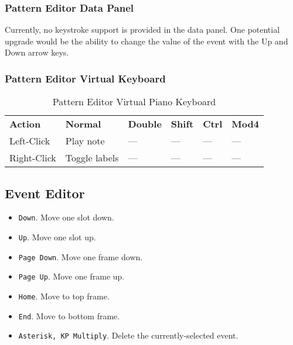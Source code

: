 \subsubsection{Pattern Editor Data Panel}
\label{subsubsec:kbd_mouse_pattern_editor_data_panel}

   Currently, no keystroke support is provided in the data panel.
   One potential upgrade would be the ability to change the value of the event
   with the Up and Down arrow keys.

\subsubsection{Pattern Editor Virtual Keyboard}
\label{subsubsec:kbd_mouse_pattern_editor_virtual_keyboard}

   \begin{table}[H]
      \centering
      \caption{Pattern Editor Virtual Piano Keyboard}
      \label{table:pattern_editor_virtual_piano_keyboard}
      \begin{tabular}{l l l l l l}
         \textbf{Action}   & \textbf{Normal} & \textbf{Double}    & \textbf{Shift} & \textbf{Ctrl}   & \textbf{Mod4}      \\
         Left-Click        & Play note       & ---                & ---            & ---             & ---                \\
         Right-Click       & Toggle labels   & ---                & ---            & ---             & ---                \\
      \end{tabular}
   \end{table}

\subsection{Event Editor}
\label{subsec:kbd_mouse_event_editor}

   \begin{itemize}
      \item \texttt{Down}.  Move one slot down.
      \item \texttt{Up}.  Move one slot up.
      \item \texttt{Page Down}.  Move one frame down.
      \item \texttt{Page Up}.  Move one frame up.
      \item \texttt{Home}.  Move to top frame.
      \item \texttt{End}.  Move to bottom frame.
      \item \texttt{Asterisk, KP Multiply}.  Delete the currently-selected event.
   \end{itemize}

